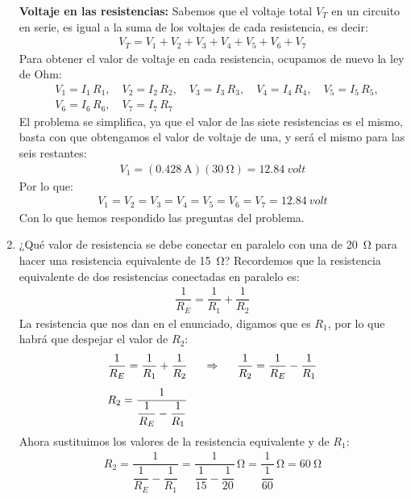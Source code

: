 \documentclass[14pt]{extarticle}
\begin{document}
\begin{enumerate}
\textbf{Voltaje en las resistencias:} Sabemos que el voltaje total $V_{T}$ en un circuito en serie, es igual a la suma de los voltajes de cada resistencia, es decir:
\begin{align*}
V_{T} = V_{1} + V_{2} + V_{3} + V_{4} + V_{5} + V_{6} + V_{7}
\end{align*}
Para obtener el valor de voltaje en cada resistencia, ocupamos de nuevo la ley de Ohm:
\begin{align*}
&V_{1} = I_{1} \, R_{1}, \quad V_{2} = I_{2} \, R_{2}, \quad V_{3} = I_{3} \, R_{3}, \quad V_{4} = I_{4} \, R_{4}, \quad V_{5} = I_{5} \, R_{5}, \\[0.5em]
&V_{6} = I_{6} \, R_{6}, \quad V_{7} = I_{7} \, R_{7}
\end{align*}
El problema se simplifica, ya que el valor de las siete resistencias es el mismo, basta con que obtengamos el valor de voltaje de una, y será el mismo para las seis restantes:
\begin{align*}
V_{1} = (\SI{0.428}{\ampere}) (\SI{30}{\ohm}) = \SI{12.84}{volt}
\end{align*}
Por lo que:
\begin{align*}
V_{1} = V_{2} = V_{3} = V_{4} = V_{5} = V_{6} = V_{7} = \SI{12.84}{volt}
\end{align*}
Con lo que hemos respondido las preguntas del problema.
\item ¿Qué valor de resistencia se debe conectar en paralelo con una de \SI{20}{\ohm} para hacer una resistencia equivalente de \SI{15}{\ohm}?
Recordemos que la resistencia equivalente de dos resistencias conectadas en paralelo es:
\begin{align*}
\dfrac{1}{R_{E}} = \dfrac{1}{R_{1}} + \dfrac{1}{R_{2}}
\end{align*}
La resistencia que nos dan en el enunciado, digamos que es $R_{1}$, por lo que habrá que despejar el valor de $R_{2}$:
\begin{align*}
&\dfrac{1}{R_{E}} = \dfrac{1}{R_{1}} + \dfrac{1}{R_{2}} \hspace{0.5cm} \Rightarrow \hspace{0.5cm} \dfrac{1}{R_{2}} = \dfrac{1}{R_{E}} - \dfrac{1}{R_{1}} \\[0.5em]
& R_{2} = \dfrac{1}{\dfrac{1}{R_{E}} - \dfrac{1}{R_{1}}}
\end{align*}
Ahora sustituimos los valores de la resistencia equivalente y de $R_{1}$:
\begin{align*}
R_{2} = \dfrac{1}{\dfrac{1}{R_{E}} - \dfrac{1}{R_{1}}} = \dfrac{1}{\dfrac{1}{15} - \dfrac{1}{20}} \, \unit{\ohm} = \dfrac{1}{ \dfrac{1}{60}} \, \unit{\ohm}= \SI{60}{\ohm}

\end{align*}
\end{enumerate}
\end{document}
